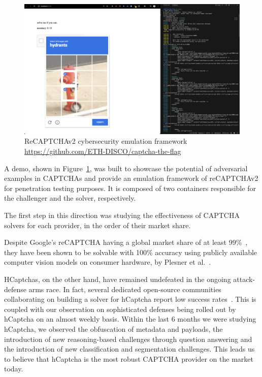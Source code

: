 \documentclass[a4paper, oneside]{discothesis}
\begin{document}
\begin{figure}
	\centering
	\includegraphics[width=1\columnwidth]{figures/ctf.png}
	\caption{ReCAPTCHAv2 cybersecurity emulation framework \\ \url{https://github.com/ETH-DISCO/captcha-the-flag}}
	\label{fig:ctf}
\end{figure}

A demo, shown in Figure~\ref{fig:ctf}, was built to showcase the potential of adversarial examples in CAPTCHAs and provide an emulation framework of reCAPTCHAv2 for penetration testing purposes. It is composed of two containers responsible for the challenger and the solver, respectively.

The first step in this direction was studying the effectiveness of CAPTCHA solvers for each provider, in the order of their market share.

Despite Google's reCAPTCHA having a global market share of at least 99\%~\cite{authkong2024recaptcha}, they have been shown to be solvable with 100\% accuracy using publicly available computer vision models on consumer hardware, by Plesner et al.~\cite{plesner2024breaking}.

HCaptchas, on the other hand, have remained undefeated in the ongoing attack-defense arms race. In fact, several dedicated open-source communities collaborating on building a solver for hCaptcha report low success rates~\cite{hcaptcha2024base64, hcaptcha_challenger}. This is coupled with our observation on sophisticated defenses being rolled out by hCaptcha on an almost weekly basis. Within the last 6 months we were studying hCaptcha, we observed the obfuscation of metadata and payloads, the introduction of new reasoning-based challenges through question answering and the introduction of new classification and segmentation challenges. This leads us to believe that hCaptcha is the most robust CAPTCHA provider on the market today.
\end{document}

